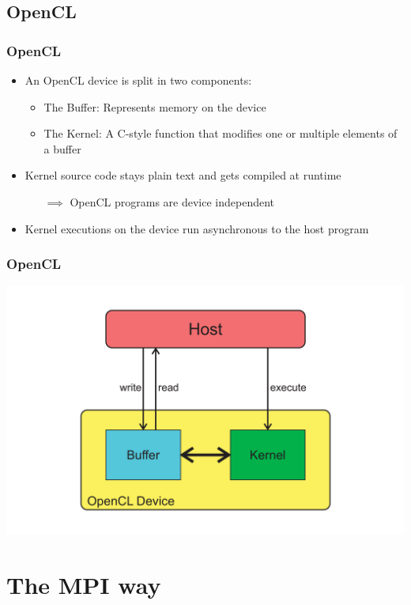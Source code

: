 \documentclass{beamer}
\begin{document}
\subsection{OpenCL}
\begin{frame}
    \frametitle{OpenCL}
    \begin{itemize}
        \item An OpenCL device is split in two components:
        \begin{itemize}
            \item The \alert{Buffer}: Represents memory on the device
            \item The \alert{Kernel}: A C-style function that modifies one or multiple
                                      elements of a buffer
        \end{itemize}
        \item Kernel source code stays plain text and gets compiled at \alert{runtime}
        \begin{itemize}
            \item[$\implies$] OpenCL programs are device independent
        \end{itemize}
        \item Kernel executions on the device run asynchronous to the host program
    \end{itemize}
\end{frame}
\begin{frame}
    \frametitle{OpenCL}
    \includegraphics[width=\textwidth]{../2014-09-25_gputalk/opencl_overview.pdf}
\end{frame}

\section{The MPI way}

\end{document}
